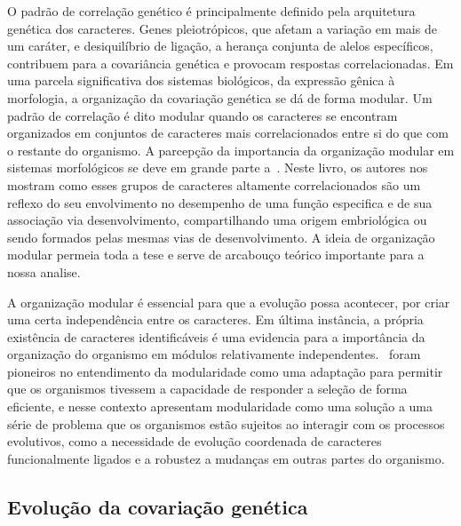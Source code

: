 \begin{refsection}
O padrão de correlação genético é principalmente definido pela arquitetura
genética dos caracteres. Genes pleiotrópicos, que afetam a variação em mais de
um caráter, e desiquilíbrio de ligação, a herança conjunta de alelos
específicos, contribuem para a covariância genética e provocam respostas
correlacionadas. Em uma parcela significativa dos sistemas biológicos, da
expressão gênica à morfologia, a organização da covariação genética se dá de
forma modular. Um padrão de correlação é dito modular quando os caracteres se
encontram organizados em conjuntos de caracteres mais correlacionados entre si
do que com o restante do organismo. A parcepção da importancia da organização
modular em sistemas morfológicos se deve em grande parte
a~\textcite{Olson1958-qk}. Neste livro, os autores nos mostram como esses
grupos de caracteres altamente correlacionados são um reflexo do seu
envolvimento no desempenho de uma função especifica e de sua associação via
desenvolvimento, compartilhando uma origem embriológica ou sendo formados
pelas mesmas vias de desenvolvimento. A ideia de organização modular permeia
toda a tese e serve de arcabouço teórico importante para a nossa
analise.

A organização modular é essencial para que a evolução possa acontecer, por
criar uma certa independência entre os caracteres. Em última instância, a
própria existência de caracteres identificáveis é uma evidencia para a
importância da organização do organismo em módulos relativamente
independentes.~\textcite{Wagner1996-ui} foram pioneiros no entendimento da
modularidade como uma adaptação para permitir que os organismos tivessem a
capacidade de responder a seleção de forma eficiente, e nesse contexto apresentam
modularidade como uma solução a uma série de problema que os organismos estão
sujeitos ao interagir com os processos evolutivos, como a necessidade de
evolução coordenada de caracteres funcionalmente ligados e a robustez a
mudanças em outras partes do organismo.

\subsection{Evolução da covariação genética}


\end{refsection}
